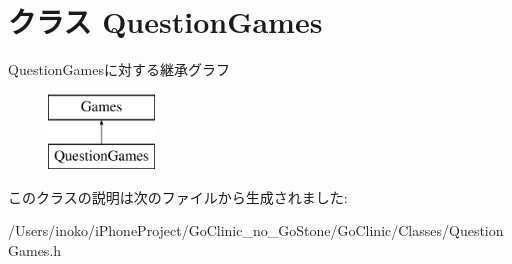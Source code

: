 \hypertarget{interface_question_games}{
\section{クラス QuestionGames}
\label{interface_question_games}
}
QuestionGamesに対する継承グラフ\begin{figure}[H]
\begin{center}
\leavevmode
\includegraphics[height=2.000000cm]{interface_question_games}
\end{center}
\end{figure}


このクラスの説明は次のファイルから生成されました:\begin{DoxyCompactItemize}
\item 
/Users/inoko/iPhoneProject/GoClinic\_\-no\_\-GoStone/GoClinic/Classes/QuestionGames.h\end{DoxyCompactItemize}
